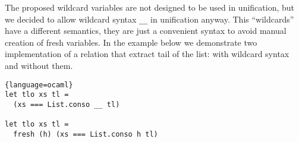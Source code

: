 The proposed wildcard variables are not designed to be used in unification, but we decided to allow wildcard syntax \lstinline|__| in unification anyway. 
This ``wildcards'' have a different semantics, they are just a convenient syntax to avoid manual creation of fresh variables. In the example below we demonstrate two implementation of a relation that extract tail of the list: with wildcard syntax and without them.

\begin{minipage}{\linewidth}
\begin{lstlisting}{language=ocaml}
let tlo xs tl =
  (xs === List.conso __ tl)

let tlo xs tl =
  fresh (h) (xs === List.conso h tl)
\end{lstlisting}
\end{minipage}
